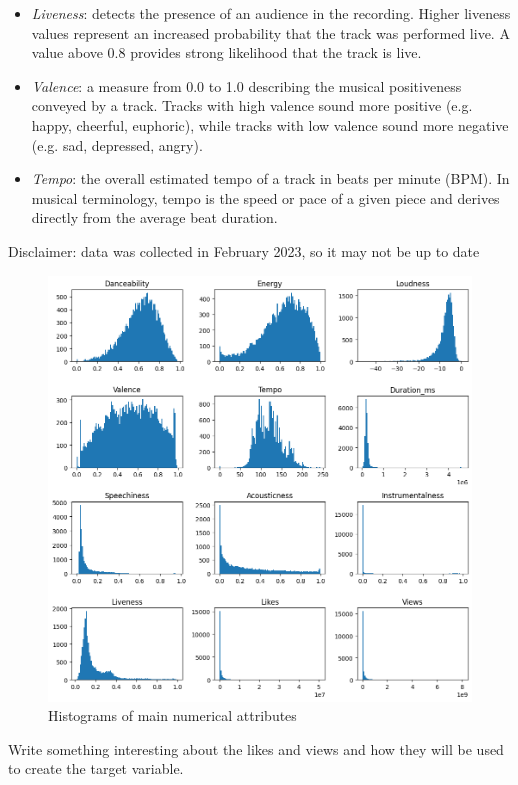 \documentclass[11pt]{article} %
\begin{document}
\begin{itemize}
	\item \textit{Liveness}: detects the presence of an audience in the recording. Higher liveness values represent an increased probability that the track was performed live. A value above 0.8 provides strong likelihood that the track is live.
	\item \textit{Valence}: a measure from 0.0 to 1.0 describing the musical positiveness conveyed by a track. Tracks with high valence sound more positive (e.g. happy, cheerful, euphoric), while tracks with low valence sound more negative (e.g. sad, depressed, angry).
	\item \textit{Tempo}: the overall estimated tempo of a track in beats per minute (BPM). In musical terminology, tempo is the speed or pace of a given piece and derives directly from the average beat duration.
\end{itemize}

Disclaimer: data was collected in February 2023, so it may not be up to date

\begin{figure}
	\centering
	\includegraphics[width=.8\linewidth]{numeric_variables_histograms.png}
	\caption{Histograms of main numerical attributes}\label{fig:numeric_variables_histograms}
\end{figure}

Write something interesting about the likes and views and how they will be used to create the target variable.
\end{document}
